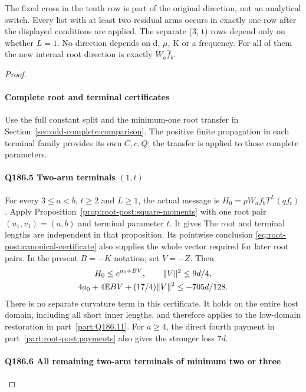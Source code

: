 The fixed cross in the tenth row is part of the original direction, not an
analytical switch. Every list with at least two residual arms occurs in exactly
one row after the displayed conditions are applied. The separate (3, t) rows
depend only on whether \(L=1\). No direction depends on d, \(\mu\), K or a frequency.
For all of them the new internal root direction is exactly \(W_a \bar f_b\).

\begin{proof}
\paragraph{Complete root and terminal certificates}
\label{part:Q186.3}\label{part:Q186.4}
Use the full constant split and the minimum-one root transfer in
Section~\ref{sec:odd-complete:comparison}. The positive finite
propagation in each terminal family provides its own $C,c,Q$;
the transfer is applied to those complete parameters.

\paragraph{Q186.5 Two-arm terminals $(1,t)$}\label{part:Q186.5}
For every $3\le a<b$, $t\ge2$ and $L\ge1$, the actual message is
$H_0=pW_a\bar f_bT^L(qf_t)$. Apply
Proposition~\ref{prop:root-post:square-moments} with one root pair
$(u_1,v_1)=(a,b)$ and terminal parameter $t$. It gives
The root and terminal lengths are independent in that proposition.
Its pointwise conclusion \eqref{eq:root-post:canonical-certificate}
also supplies the whole vector required for later root pairs. In the
present $B=-K$ notation, set $V=-Z$. Then
\begin{equation}\label{eq:odd186:short-one-certificate}
 \begin{gathered}
 H_0\le e^{a_0+BV},\qquad \|V\|^2\le9d/4,\\
 4a_0+4\mathbb E BV+(17/4)\|V\|^2\le-705d/128.
 \end{gathered}
\end{equation}
There is no separate curvature term in this certificate. It holds
on the entire host domain, including all short inner lengths, and
therefore applies to the low-domain restoration in part~\ref{part:Q186.11}.
For $a\ge4$, the direct fourth payment in
part~\ref{part:root-post:payments} also gives the stronger loss $7d$.

\paragraph{Q186.6 All remaining two-arm terminals of minimum two or three}


\end{proof}
